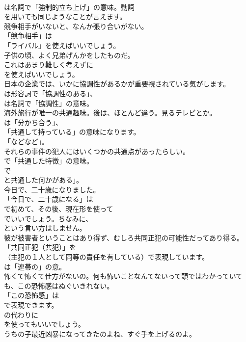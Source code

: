\documentclass[8pt]{extreport}
\begin{document}
\begin{CJK}{UTF8}{min}
\\	は名詞で「強制的立ち上げ」の意味。動詞
\\	を用いても同じようなことが言えます。	
\\	競争相手がいないと、なんか張り合いがない。 
\\	「競争相手」は
\\	「ライバル」を使えばいいでしょう。	
\\	子供の頃、よく兄弟げんかをしたものだ。 
\\	これはあまり難しく考えずに
\\	を使えばいいでしょう。	
\\	日本の企業では、いかに協調性があるかが重要視されている気がします。 
\\	は形容詞で「協調性のある」、
\\	は名詞で「協調性」の意味。	
\\	海外旅行が唯一の共通趣味。後は、ほとんど違う。見るテレビとか。 
\\	は「分かち合う」、
\\	「共通して持っている」の意味になります。
\\	「などなど」。	
\\	それらの事件の犯人にはいくつかの共通点があったらしい。 
\\	で「共通した特徴」の意味。
\\	で
\\	と共通した何かがある」。	
\\	今日で、二十歳になりました。 
\\	「今日で、二十歳になる」は
\\	で初めて、その後、現在形を使って
\\	でいいでしょう。ちなみに、
\\	という言い方はしません。	
\\	彼が被害者ということはあり得ず、むしろ共同正犯の可能性だってあり得る。 
\\	「共同正犯（共犯）」を 
\\	（主犯の１人として同等の責任を有している）で表現しています。
\\	は「連帯の」の意。	
\\	怖くて怖くて仕方がないの。何も怖いことなんてないって頭ではわかっていても、この恐怖感はぬぐいきれない。 
\\	「この恐怖感」は 
\\	で表現できます。
\\	の代わりに 
\\	を使ってもいいでしょう。	
\\	うちの子最近凶暴になってきたのよね、すぐ手を上げるのよ。 

\end{CJK}
\end{document}
